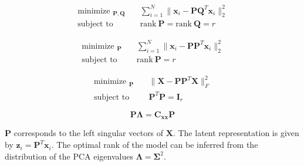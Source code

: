 \documentclass[aspectratio=169, usenames, dvipsnames]{beamer}
\DeclareMathOperator*{\minimize}{minimize~}
\DeclareMathOperator*{\subto}{subject~to~}
\begin{document}
\begin{frame}
  \vfill

  \begin{overprint}
    \Large
    \[
    \begin{aligned}
      \minimize_{\bm{P}, \bm{Q}} & \quad \sum_{i=1}^N \| \bm{x}_i - \bm{PQ}^T \bm{x}_i \|_2^2 \\
      \subto & \quad \mathrm{rank~} \bm{P} = \mathrm{rank~} \bm{Q} = r
    \end{aligned}
    \]

    \Large
    \[
    \begin{aligned}
      \minimize_{\bm{P}} & \quad \sum_{i=1}^N \| \bm{x}_i - \bm{PP}^T \bm{x}_i \|_2^2 \\
      \subto & \quad \mathrm{rank~} \bm{P} = r
    \end{aligned}
    \]

  \end{overprint}

  \vfill
\end{frame}

\begin{frame}
  \vfill
  \Large
  \[
  \begin{aligned}
    \minimize_{\bm{P}} & \quad \| \bm{X} - \bm{PP}^T \bm{X} \|_F^2 \\
    \subto & \quad \bm{P}^T \bm{P} = \bm{I}_r
  \end{aligned}
  \]

  \vfill
\end{frame}

\begin{frame}
  \vfill

  \begin{tcolorbox}[
    enhanced,
    coltitle=black,
    coltext=white,
    colback=black,
    title=\textbf{Proper Orthogonal Decomposition},
    frame style tile={width=\paperwidth}{background.jpg}
    ]

    \medskip

    \large

    \[
    \bm{P} \boldsymbol{\Lambda} = \bm{C}_{\bm{xx}} \bm{P}
    \]

    \medskip
  \end{tcolorbox}

  \vfill

  $\bm{P}$ corresponds to the left singular vectors of $\bm{X}$.
  The latent representation is given by $\bm{z}_i = \bm{P}^T \bm{x}_i$.
  The optimal rank of the model can be inferred from the distribution of the PCA eigenvalues $\boldsymbol{\Lambda} = \boldsymbol{\Sigma}^2$.

  \vfill
\end{frame}
\end{document}

